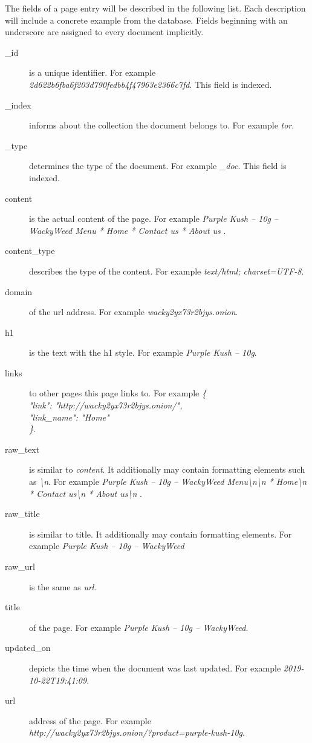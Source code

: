 The fields of a page entry will be described in the following list. Each description will include a concrete example from the database. Fields beginning with an underscore are assigned to every document implicitly.
\begin {description}
	\item[\_id] is a unique identifier. For example\\ \textit{2d622b6fba6f203d790fedbb4f47963e2366c7fd}. This field is indexed. 
	\item[\_index] informs about the collection the document belongs to. For example \textit{tor}. 
	\item[\_type] determines the type of the document. For example \textit{\_doc}. This field is indexed. 
	\item[content] is the actual content of the page. For example \textit{Purple Kush – 10g – WackyWeed Menu    * Home   * Contact us   * About us }.
	\item[content\_type] describes the type of the content. For example \textit{text/html; charset=UTF-8}.
	\item[domain] of the url address. For example \textit{wacky2yx73r2bjys.onion}.
	\item[h1] is the text with the h1 style. For example \textit{Purple Kush – 10g}.
	\item[links] to other pages this page links to. For example \textit{\{\\
  "link": "http://wacky2yx73r2bjys.onion/",\\
  "link\_name": "Home"\\
\}}.
	\item[raw\_text] is similar to \textit{content}. It additionally may contain formatting elements such as \textit{\textbackslash n}. For example \textit{Purple Kush – 10g – WackyWeed Menu\textbackslash n\textbackslash n  * Home\textbackslash n  * Contact us\textbackslash n  * About us\textbackslash n }.
	\item[raw\_title] is similar to title. It additionally may contain formatting elements. For example \textit{Purple Kush – 10g – WackyWeed}
	\item[raw\_url] is the same as \textit{url}.
	\item[title] of the page. For example \textit{Purple Kush – 10g – WackyWeed}.
	\item[updated\_on] depicts the time when the document was last updated. For example \textit{2019-10-22T19:41:09}.
	\item[url] address of the page. For example \\ \textit{http://wacky2yx73r2bjys.onion/?product=purple-kush-10g}.
\end{description}